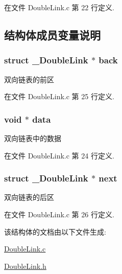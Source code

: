在文件 Double\-Link.\-c 第 22 行定义.



\subsection{结构体成员变量说明}
\hypertarget{struct___double_link_af341c0d6517f5032958cd89884e6230e}{
\subsubsection[{back}]{\setlength{\rightskip}{0pt plus 5cm}struct {\bf \-\_\-\-Double\-Link} $\ast$ back}}\label{struct___double_link_af341c0d6517f5032958cd89884e6230e}


双向链表的前区 



在文件 Double\-Link.\-c 第 25 行定义.

\hypertarget{struct___double_link_ac5c5967f62e5c3601479be651a8ed76c}{
\subsubsection[{data}]{\setlength{\rightskip}{0pt plus 5cm}void $\ast$ data}}\label{struct___double_link_ac5c5967f62e5c3601479be651a8ed76c}


双向链表中的数据 



在文件 Double\-Link.\-c 第 24 行定义.

\hypertarget{struct___double_link_a639ac2cfb816181dcb50312819536299}{
\subsubsection[{next}]{\setlength{\rightskip}{0pt plus 5cm}struct {\bf \-\_\-\-Double\-Link} $\ast$ next}}\label{struct___double_link_a639ac2cfb816181dcb50312819536299}


双向链表的后区 



在文件 Double\-Link.\-c 第 26 行定义.



该结构体的文档由以下文件生成\-:\begin{DoxyCompactItemize}
\item 
\hyperlink{_double_link_8c}{Double\-Link.\-c}\item 
\hyperlink{_double_link_8h}{Double\-Link.\-h}\end{DoxyCompactItemize}
